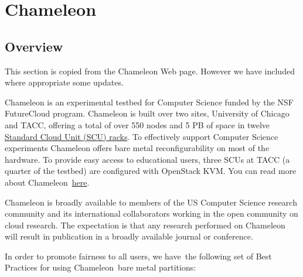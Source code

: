 
%


\part{Chameleon}
\label{P:chameleon}

\chapter{Overview}


\FILENAME

This section is copied from the Chameleon Web page. However we have
included where appropriate some updates. 

Chameleon is an experimental testbed for Computer Science funded by the
NSF FutureCloud program. Chameleon is built over two sites, University
of Chicago and TACC, offering a total of over 550 nodes and 5 PB of
space in twelve
\href{https://www.chameleoncloud.org/about/hardware-description/}{Standard
Cloud Unit (SCU) racks}. To effectively support Computer Science
experiments Chameleon offers bare metal reconfigurability on most of the
hardware. To provide easy access to educational users, three SCUs at
TACC (a quarter of the testbed) are configured with OpenStack KVM. You
can read more about
Chameleon~\href{https://www.chameleoncloud.org/about/chameleon/}{here}.

Chameleon is broadly available to members of the US Computer Science
research community and its international collaborators working in the
open community on cloud research. The expectation is that any research
performed on Chameleon will result in publication in a broadly
available journal or conference.

In order to promote fairness to all users, we have~the following set of
Best Practices for using Chameleon~bare metal partitions:

